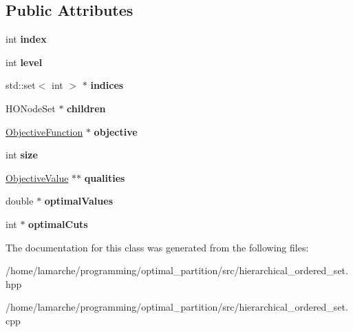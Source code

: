 \subsection*{Public Attributes}
\begin{DoxyCompactItemize}
\item 
\hypertarget{classHONode_afdceeb6b9dd641633be6b81380b9bb0f}{int {\bfseries index}}\label{classHONode_afdceeb6b9dd641633be6b81380b9bb0f}

\item 
\hypertarget{classHONode_ae8d4dd48892372be94f6e214450c5e44}{int {\bfseries level}}\label{classHONode_ae8d4dd48892372be94f6e214450c5e44}

\item 
\hypertarget{classHONode_a8d093f3290293ea7b7e03a185798fe64}{std\-::set$<$ int $>$ $\ast$ {\bfseries indices}}\label{classHONode_a8d093f3290293ea7b7e03a185798fe64}

\item 
\hypertarget{classHONode_a1c4e4ef9ffa03161b427606cd6255b52}{H\-O\-Node\-Set $\ast$ {\bfseries children}}\label{classHONode_a1c4e4ef9ffa03161b427606cd6255b52}

\item 
\hypertarget{classHONode_a3fd5dd67e556117b39d50412718f47e4}{\hyperlink{classObjectiveFunction}{Objective\-Function} $\ast$ {\bfseries objective}}\label{classHONode_a3fd5dd67e556117b39d50412718f47e4}

\item 
\hypertarget{classHONode_ad63d56300726c5d89d11276ab1c3fdec}{int {\bfseries size}}\label{classHONode_ad63d56300726c5d89d11276ab1c3fdec}

\item 
\hypertarget{classHONode_acf196983ba89362f7509dbf1758513d3}{\hyperlink{classObjectiveValue}{Objective\-Value} $\ast$$\ast$ {\bfseries qualities}}\label{classHONode_acf196983ba89362f7509dbf1758513d3}

\item 
\hypertarget{classHONode_af9e4cf35f08fe3c9d4ec44cabc1d439d}{double $\ast$ {\bfseries optimal\-Values}}\label{classHONode_af9e4cf35f08fe3c9d4ec44cabc1d439d}

\item 
\hypertarget{classHONode_ac2b2e15ed1a6893c073d2551c735b2d2}{int $\ast$ {\bfseries optimal\-Cuts}}\label{classHONode_ac2b2e15ed1a6893c073d2551c735b2d2}

\end{DoxyCompactItemize}


The documentation for this class was generated from the following files\-:\begin{DoxyCompactItemize}
\item 
/home/lamarche/programming/optimal\-\_\-partition/src/hierarchical\-\_\-ordered\-\_\-set.\-hpp\item 
/home/lamarche/programming/optimal\-\_\-partition/src/hierarchical\-\_\-ordered\-\_\-set.\-cpp\end{DoxyCompactItemize}
